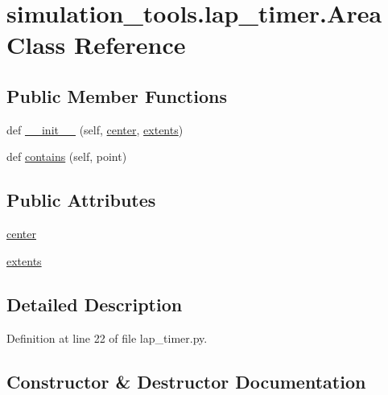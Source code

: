 \hypertarget{classsimulation__tools_1_1lap__timer_1_1_area}{}\section{simulation\+\_\+tools.\+lap\+\_\+timer.\+Area Class Reference}
\label{classsimulation__tools_1_1lap__timer_1_1_area}
\subsection*{Public Member Functions}
\begin{DoxyCompactItemize}
\item 
def \hyperlink{classsimulation__tools_1_1lap__timer_1_1_area_a2e75d876da719cbb38730d143eecd8e3}{\+\_\+\+\_\+init\+\_\+\+\_\+} (self, \hyperlink{classsimulation__tools_1_1lap__timer_1_1_area_ab6d54ce6f15f7931e2c97c418ef275ec}{center}, \hyperlink{classsimulation__tools_1_1lap__timer_1_1_area_a5a876b3d7c79ddb803e0e66d851c8c4d}{extents})
\item 
def \hyperlink{classsimulation__tools_1_1lap__timer_1_1_area_a846e52eda13a26067757cabc759a4f1c}{contains} (self, point)
\end{DoxyCompactItemize}
\subsection*{Public Attributes}
\begin{DoxyCompactItemize}
\item 
\hyperlink{classsimulation__tools_1_1lap__timer_1_1_area_ab6d54ce6f15f7931e2c97c418ef275ec}{center}
\item 
\hyperlink{classsimulation__tools_1_1lap__timer_1_1_area_a5a876b3d7c79ddb803e0e66d851c8c4d}{extents}
\end{DoxyCompactItemize}


\subsection{Detailed Description}


Definition at line 22 of file lap\+\_\+timer.\+py.



\subsection{Constructor \& Destructor Documentation}
